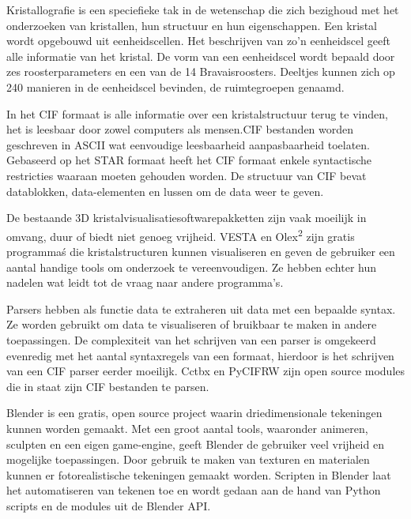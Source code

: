 Kristallografie is een speciefieke tak in de wetenschap die zich bezighoud met het onderzoeken van kristallen, hun structuur en hun eigenschappen. Een kristal wordt opgebouwd uit eenheidscellen. Het beschrijven van zo'n eenheidscel geeft alle informatie van het kristal. De vorm van een eenheidscel wordt bepaald door zes roosterparameters en een van de 14 Bravaisroosters. Deeltjes kunnen zich op 240 manieren in de eenheidscel bevinden, de ruimtegroepen genaamd.
\par
In het CIF formaat is alle informatie over een kristalstructuur terug te vinden, het is leesbaar door zowel computers als mensen.CIF bestanden worden geschreven in ASCII wat eenvoudige leesbaarheid aanpasbaarheid toelaten. Gebaseerd op het STAR formaat heeft het CIF formaat enkele syntactische restricties waaraan moeten gehouden worden. De structuur van CIF bevat datablokken, data-elementen en lussen om de data weer te geven.
\par
De bestaande 3D kristalvisualisatiesoftwarepakketten zijn vaak moeilijk in omvang, duur of biedt niet genoeg vrijheid. VESTA en Olex\textsuperscript{2} zijn gratis programma\' s die kristalstructuren kunnen visualiseren en geven de gebruiker een aantal handige tools om onderzoek te vereenvoudigen. Ze hebben echter hun nadelen wat leidt tot de vraag naar andere programma's.
\par
Parsers hebben als functie data te extraheren uit data met een bepaalde syntax. Ze worden gebruikt om data te visualiseren of bruikbaar te maken in andere toepassingen. De complexiteit van het schrijven van een parser is omgekeerd evenredig met het aantal syntaxregels van een formaat, hierdoor is het schrijven van een CIF parser eerder moeilijk. Cctbx en PyCIFRW zijn open source modules die in staat zijn CIF bestanden te parsen.
\par
Blender is een gratis, open source project waarin driedimensionale tekeningen kunnen worden gemaakt. Met een groot aantal tools, waaronder animeren, sculpten en een eigen game-engine, geeft Blender de gebruiker veel vrijheid en mogelijke toepassingen. Door gebruik te maken van texturen en materialen kunnen er fotorealistische tekeningen gemaakt worden. Scripten in Blender laat het automatiseren van tekenen toe en wordt gedaan aan de hand van Python scripts en de modules uit de Blender API.   